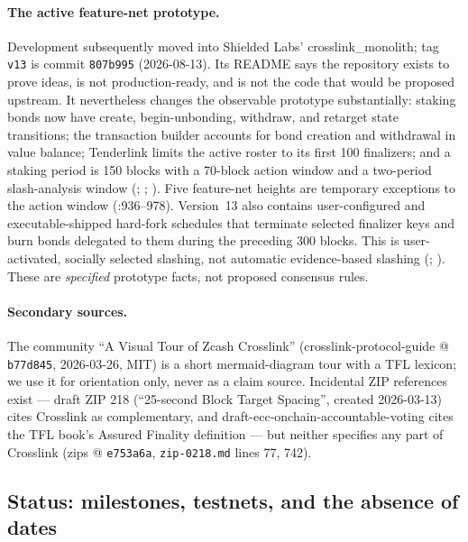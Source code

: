\documentclass[11pt,a4paper]{article}
\theoremstyle{definition}
\begin{document}
\paragraph{The active feature-net prototype.} Development subsequently
moved into Shielded Labs' \textsf{crosslink\_monolith}; tag \texttt{v13}
is commit \texttt{807b995} (2026-08-13). Its README says the repository
exists to prove ideas, is not production-ready, and is not the code that
would be proposed upstream. It nevertheless changes the observable
prototype substantially: staking bonds now have create, begin-unbonding,
withdraw, and retarget state transitions; the transaction builder accounts
for bond creation and withdrawal in value balance; Tenderlink limits the
active roster to its first 100 finalizers; and a staking period is 150 blocks with a
70-block action window and a two-period slash-analysis window
(;
;
).
Five feature-net heights are temporary exceptions to the action window
(:936--978).
Version~13 also
contains user-configured and executable-shipped hard-fork schedules that
terminate selected finalizer keys and burn bonds delegated to them during the
preceding 300 blocks. This is user-activated, socially selected slashing,
not automatic evidence-based slashing
(;
).
These are \emph{specified} prototype
facts, not proposed consensus rules.

\paragraph{Secondary sources.} The community ``A Visual Tour of Zcash
Crosslink'' (crosslink-protocol-guide @ \texttt{b77d845}, 2026-03-26,
MIT) is a short mermaid-diagram tour with a TFL lexicon; we use it for
orientation only, never as a claim source. Incidental ZIP references
exist --- draft ZIP 218 (``25-second Block Target Spacing'', created
2026-03-13) cites Crosslink as complementary, and
draft-ecc-onchain-accountable-voting cites the TFL book's Assured
Finality definition --- but neither specifies any part of Crosslink
(zips @ \texttt{e753a6a}, \texttt{zip-0218.md} lines 77, 742).

\subsection{Status: milestones, testnets, and the absence of
dates}\label{sec:xl-status}
\end{document}
